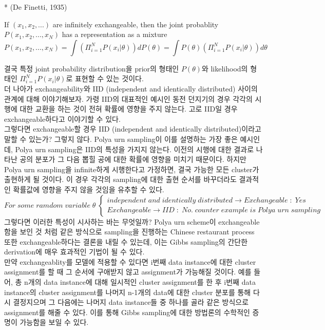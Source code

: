 \documentclass[a4paper]{oblivoir}
\begin{document}
* (De Finetti, 1935) 
\begin{center}
If $(x_{1},x_{2},...)$ are infinitely exchangeable, then the joint probablity $P(x_{1},x_{2},...,x_{N})$ has a representation as a mixture
\begin{equation}
P(x_{1},x_{2},...,x_{N}) = \int(\Pi^{N}_{i=1}P(x_{i}|\theta))dP(\theta) = \int P(\theta)(\Pi^{N}_{i=1}P(x_{i}|\theta))d\theta
\end{equation}
\end{center}
결국 특정 joint probability distribution을 prior의 형태인 $P(\theta)$와 likelihood의 형태인 $\Pi^{N}_{i=1}P(x_{i}|\theta)$로 표현할 수 있는 것이다.\\
더 나아가 exchangeability와 IID (independent and identically distributed) 사이의 관계에 대해 이야기해보자. 가령 IID의 대표적인 예시인 동전 던지기의 경우 각각의 시행에 대한 교환을 하는 것이 전혀 확률에 영향을 주지 않는다. 고로 IID일 경우 exchangeable하다고 이야기할 수 있다.\\
그렇다면 exchangeable할 경우 IID (independent and identically distributed)이라고 말할 수 있는가? 그렇지 않다. Polya urn sampling이 이를 설명하는 가장 좋은 예시인데, Polya urn sampling은 IID의 특성을 가지지 않는다. 이전의 시행에 대한 결과로 나타난 공의 분포가 그 다음 뽑힐 공에 대한 확률에 영향을 미치기 때문이다. 하지만 Polya urn sampling을 infinite하게 시행한다고 가정하면, 결국 가능한 모든 cluster가 출현하게 될 것이다. 이 경우 각각의 sampling에 대한 출현 순서를 바꾸더라도 결과적인 확률값에 영향을 주지 않을 것임을 유추할 수 있다. 
\begin{equation}
For\; some\; ramdom\; variable\; \theta\;
\begin{cases} 
independent\; and\; identically\; distributed \rightarrow Exchangeable\; : \;Yes \\
Exchangeable \rightarrow IID\; :\; No.\; counter \;example\;is \;Polya\; urn \;sampling
\end{cases}
\end{equation}
그렇다면 이러한 특성이 시사하는 바는 무엇일까?  Polya urn scheme이 exchangeable함을 보인 것 처럼 같은 방식으로 sampling을 진행하는 Chinese restaurant process 또한 exchangeable하다는 결론을 내릴 수 있는데, 이는 Gibbs sampling의 간단한 derivation에 매우 효과적인 기법이 될 수 있다.\\
만약 exchangeablity를 모델에 적용할 수 있다면 i번째 data instance에 대한 cluster assignment를 할 때 그 순서에 구애받지 않고 assignment가 가능해질 것이다. 예를 들어, 총 n개의 data instance에 대해 일시적인 cluster assignment를 한 후 i번째 data instance의 cluster assignment를 나머지 n-1개의 data에 대한 cluster 분포를 통해 다시 결정지으며 그 다음에는 나머지 data instance들 중 하나를 골라 같은 방식으로 assignment를 해줄 수 있다. 이를 통해 Gibbs sampling에 대한 방법론의 수학적인 증명이 가능함을 보일 수 있다.
\end{document}
